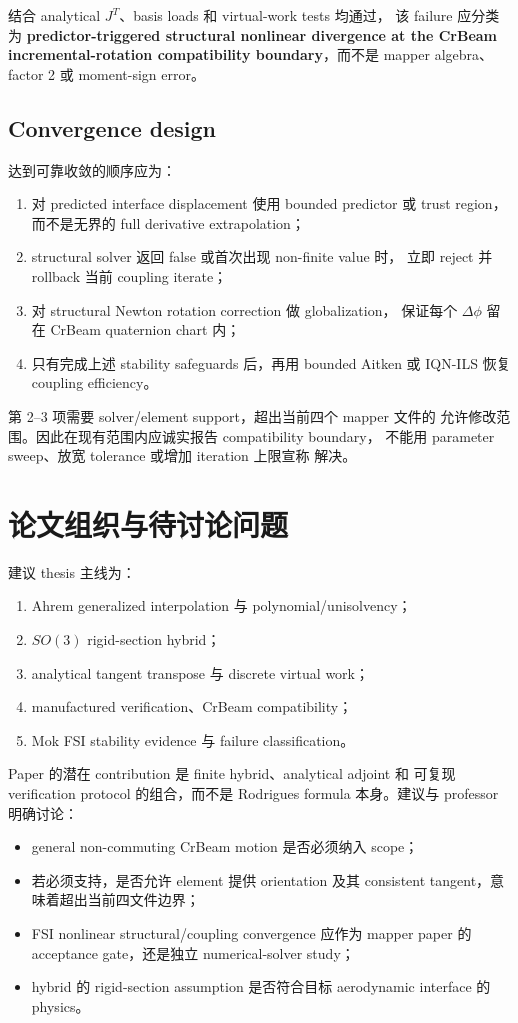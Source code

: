 \documentclass[11pt,a4paper]{article}
\begin{document}
结合 analytical $J^T$、basis loads 和 virtual-work tests 均通过，
该 failure 应分类为
\textbf{predictor-triggered structural nonlinear divergence at the
CrBeam incremental-rotation compatibility boundary}，而不是 mapper
algebra、factor 2 或 moment-sign error。

\subsection{Convergence design}

达到可靠收敛的顺序应为：
\begin{enumerate}
  \item 对 predicted interface displacement 使用 bounded predictor
        或 trust region，而不是无界的 full derivative extrapolation；
  \item structural solver 返回 false 或首次出现 non-finite value 时，
        立即 reject 并 rollback 当前 coupling iterate；
  \item 对 structural Newton rotation correction 做 globalization，
        保证每个 $\Delta\phi$ 留在 CrBeam quaternion chart 内；
  \item 只有完成上述 stability safeguards 后，再用 bounded Aitken
        或 IQN-ILS 恢复 coupling efficiency。
\end{enumerate}
第 2--3 项需要 solver/element support，超出当前四个 mapper 文件的
允许修改范围。因此在现有范围内应诚实报告 compatibility boundary，
不能用 parameter sweep、放宽 tolerance 或增加 iteration 上限宣称
解决。

\section{论文组织与待讨论问题}

建议 thesis 主线为：
\begin{enumerate}
  \item Ahrem generalized interpolation 与 polynomial/unisolvency；
  \item $SO(3)$ rigid-section hybrid；
  \item analytical tangent transpose 与 discrete virtual work；
  \item manufactured verification、CrBeam compatibility；
  \item Mok FSI stability evidence 与 failure classification。
\end{enumerate}

Paper 的潜在 contribution 是 finite hybrid、analytical adjoint 和
可复现 verification protocol 的组合，而不是 Rodrigues formula
本身。建议与 professor 明确讨论：
\begin{itemize}
  \item general non-commuting CrBeam motion 是否必须纳入 scope；
  \item 若必须支持，是否允许 element 提供 orientation 及其 consistent
        tangent，意味着超出当前四文件边界；
  \item FSI nonlinear structural/coupling convergence 应作为 mapper
        paper 的 acceptance gate，还是独立 numerical-solver study；
  \item hybrid 的 rigid-section assumption 是否符合目标 aerodynamic
        interface 的 physics。
\end{itemize}
\end{document}
